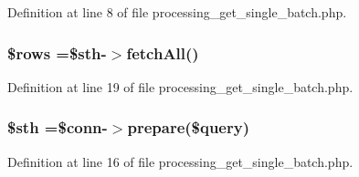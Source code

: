 Definition at line 8 of file processing\-\_\-get\-\_\-single\-\_\-batch.\-php.

\hypertarget{processing__get__single__batch_8php_ace2ec39e7df3899fa8df9640ec274b03}{
\subsubsection[{\$rows}]{\setlength{\rightskip}{0pt plus 5cm}\$rows =\$sth-\/$>$fetch\-All()}}\label{processing__get__single__batch_8php_ace2ec39e7df3899fa8df9640ec274b03}


Definition at line 19 of file processing\-\_\-get\-\_\-single\-\_\-batch.\-php.

\hypertarget{processing__get__single__batch_8php_afa9126f9664959c02795be300a135f93}{
\subsubsection[{\$sth}]{\setlength{\rightskip}{0pt plus 5cm}\$sth =\$conn-\/$>$prepare(\$query)}}\label{processing__get__single__batch_8php_afa9126f9664959c02795be300a135f93}


Definition at line 16 of file processing\-\_\-get\-\_\-single\-\_\-batch.\-php.

